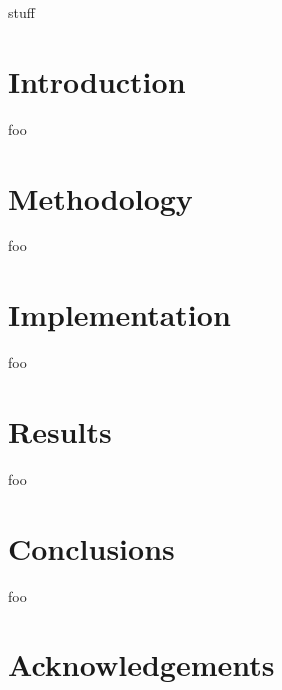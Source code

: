 \documentclass[review]{elsarticle}
\begin{document}
 

\newpage
stuff
\section{Introduction}

foo

\section{Methodology}

foo

\section{Implementation}

foo

\section {Results}

foo

\section{Conclusions}

foo

\section*{Acknowledgements}


\newpage
\section*{\refname}

\end{document}

